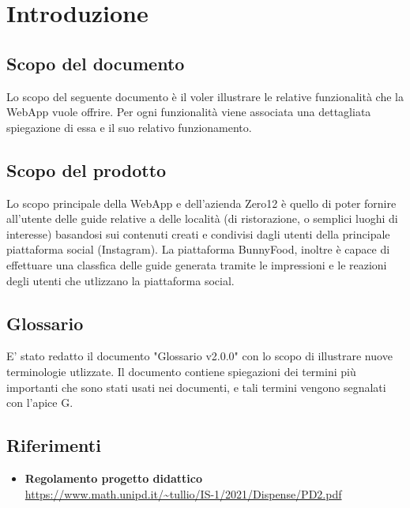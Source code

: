 \section{Introduzione}

\subsection{Scopo del documento}
Lo scopo del seguente documento è il voler illustrare
le relative funzionalità che la WebApp \platform vuole offrire.
Per ogni funzionalità viene associata una dettagliata spiegazione di essa e
il suo relativo funzionamento.

\subsection{Scopo del prodotto}
Lo scopo principale della WebApp \platform e dell'azienda Zero12 è quello di poter fornire all'utente delle guide
relative a delle località (di ristorazione, o semplici luoghi di interesse) basandosi sui contenuti creati e condivisi dagli utenti
della principale piattaforma social (Instagram). 
La piattaforma BunnyFood, inoltre è capace di effettuare una classfica delle guide generata tramite le impressioni e le reazioni degli utenti 
che utlizzano la piattaforma social.

\subsection{Glossario}
E' stato redatto il documento "Glossario v2.0.0" con lo scopo di illustrare nuove terminologie utlizzate.
Il documento contiene spiegazioni dei termini più importanti che sono stati usati nei documenti, e tali termini
vengono segnalati con l'apice G.

\subsection{Riferimenti}
\begin{itemize}
	\item
	{\textbf{Regolamento progetto didattico}}\\\url{https://www.math.unipd.it/~tullio/IS-1/2021/Dispense/PD2.pdf}

\end{itemize}
